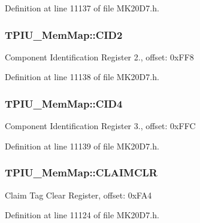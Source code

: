 Definition at line 11137 of file M\+K20\+D7.\+h.

\subsubsection[{\texorpdfstring{C\+I\+D2}{CID2}}]{ T\+P\+I\+U\+\_\+\+Mem\+Map\+::\+C\+I\+D2}\hypertarget{struct_t_p_i_u___mem_map_a3b613f265bf4b8c679e4da5f002eb4cd}{}\label{struct_t_p_i_u___mem_map_a3b613f265bf4b8c679e4da5f002eb4cd}
Component Identification Register 2., offset\+: 0x\+F\+F8 

Definition at line 11138 of file M\+K20\+D7.\+h.

\subsubsection[{\texorpdfstring{C\+I\+D4}{CID4}}]{ T\+P\+I\+U\+\_\+\+Mem\+Map\+::\+C\+I\+D4}\hypertarget{struct_t_p_i_u___mem_map_ae113185bb92abeaaa996a345b28d33a8}{}\label{struct_t_p_i_u___mem_map_ae113185bb92abeaaa996a345b28d33a8}
Component Identification Register 3., offset\+: 0x\+F\+FC 

Definition at line 11139 of file M\+K20\+D7.\+h.

\subsubsection[{\texorpdfstring{C\+L\+A\+I\+M\+C\+LR}{CLAIMCLR}}]{ T\+P\+I\+U\+\_\+\+Mem\+Map\+::\+C\+L\+A\+I\+M\+C\+LR}\hypertarget{struct_t_p_i_u___mem_map_a01f1e255c3a45165fab0992c2db91029}{}\label{struct_t_p_i_u___mem_map_a01f1e255c3a45165fab0992c2db91029}
Claim Tag Clear Register, offset\+: 0x\+F\+A4 

Definition at line 11124 of file M\+K20\+D7.\+h.

